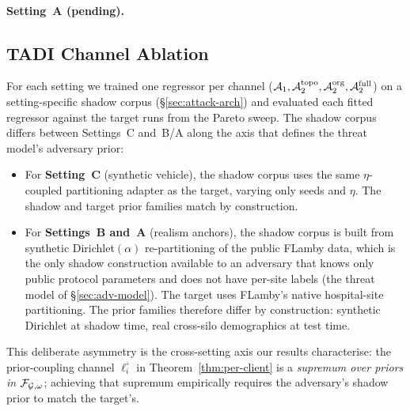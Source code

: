 

\paragraph{Setting~A (pending).}

\subsection{TADI Channel Ablation}
\label{sec:experiments-channels}

For each setting we trained one \TADI regressor per channel
($\mathcal{A}_1, \mathcal{A}_2^{\text{topo}}, \mathcal{A}_2^{\text{org}}, \mathcal{A}_2^{\text{full}}$)
on a setting-specific shadow corpus (\S\ref{sec:attack-arch}) and
evaluated each fitted regressor against the target runs from the
Pareto sweep. The shadow corpus differs between Settings~C and~B/A
along the axis that defines the threat model's adversary prior:

\begin{itemize}[topsep=2pt,itemsep=2pt,leftmargin=*]
\item For \textbf{Setting~C} (synthetic vehicle), the shadow corpus
  uses the same $\eta$-coupled partitioning adapter as the target,
  varying only seeds and $\eta$. The shadow and target prior families
  match by construction.
\item For \textbf{Settings~B and~A} (realism anchors), the shadow
  corpus is built from synthetic Dirichlet$(\alpha)$ re-partitioning of
  the public FLamby data, which is the only shadow construction
  available to an adversary that knows only public protocol parameters
  and does not have per-site labels (the threat model of
  \S\ref{sec:adv-model}). The target uses FLamby's native hospital-site
  partitioning. The prior families therefore differ by construction:
  synthetic Dirichlet at shadow time, real cross-silo demographics at
  test time.
\end{itemize}

This deliberate asymmetry is the cross-setting axis our results
characterise: the prior-coupling channel $\ell_i^\circ$ in
Theorem~\ref{thm:per-client} is a \emph{supremum over priors in
$\mathcal{F}_{\mathcal{G},\omega}$}; achieving that supremum empirically requires
the adversary's shadow prior to match the target's.

